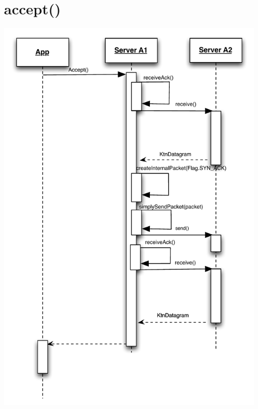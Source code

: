 \documentclass{article}
\begin{document}
\section{accept()}
\includegraphics[scale=0.8]{ktnAccept.pdf}
\end{document}
